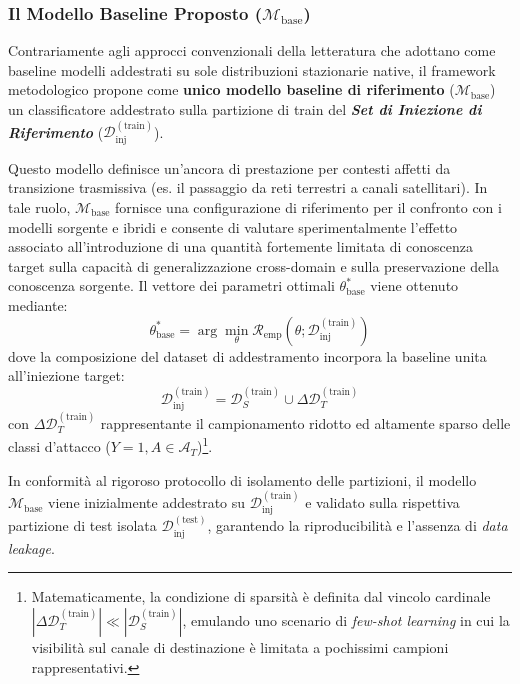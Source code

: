\subsubsection{Il Modello Baseline Proposto ($\mathcal{M}_{\text{base}}$)}
\label{subsubsec:modello_baseline}
Contrariamente agli approcci convenzionali della letteratura che adottano come baseline modelli addestrati su sole distribuzioni stazionarie native, il framework metodologico propone come \textbf{unico modello baseline di riferimento} ($\mathcal{M}_{\text{base}}$) un classificatore addestrato sulla partizione di train del \textbf{\textit{Set di Iniezione di Riferimento}} ($\mathcal{D}_{\text{inj}}^{(\text{train})}$).

Questo modello definisce un'ancora di prestazione per contesti affetti da transizione trasmissiva (es. il passaggio da reti terrestri a canali satellitari). 
In tale ruolo, $\mathcal{M}_{\text{base}}$ fornisce una configurazione di riferimento per il confronto con i modelli sorgente e ibridi e consente di valutare sperimentalmente l'effetto associato all'introduzione di una quantità fortemente limitata di conoscenza target sulla capacità di generalizzazione cross-domain e sulla preservazione della conoscenza sorgente. 
Il vettore dei parametri ottimali $\theta_{\text{base}}^*$ viene ottenuto mediante:
\begin{equation}
    \theta_{\text{base}}^* = \arg\min_\theta \mathcal{R}_{\text{emp}}\left(\theta; \mathcal{D}_{\text{inj}}^{(\text{train})}\right)
    \label{eq:mbase_optimization}
\end{equation}
dove la composizione del dataset di addestramento incorpora la baseline unita all'iniezione target:
\begin{equation}
    \mathcal{D}_{\text{inj}}^{(\text{train})} = \mathcal{D}_{S}^{(\text{train})} \cup \Delta \mathcal{D}_{T}^{(\text{train})}
    \label{eq:dinj_composition}
\end{equation}
con $\Delta \mathcal{D}_{T}^{(\text{train})}$ rappresentante il campionamento ridotto ed altamente sparso delle classi d'attacco ($Y=1, A \in \mathcal{A}_T$)\footnote{Matematicamente, la condizione di sparsità è definita dal vincolo cardinale $|\Delta \mathcal{D}_{T}^{(\text{train})}| \ll |\mathcal{D}_{S}^{(\text{train})}|$, emulando uno scenario di \textit{few-shot learning} in cui la visibilità sul canale di destinazione è limitata a pochissimi campioni rappresentativi.}.

In conformità al rigoroso protocollo di isolamento delle partizioni, il modello $\mathcal{M}_{\text{base}}$ viene inizialmente addestrato su $\mathcal{D}_{\text{inj}}^{(\text{train})}$ e validato sulla rispettiva partizione di test isolata $\mathcal{D}_{\text{inj}}^{(\text{test})}$, garantendo la riproducibilità e l'assenza di \textit{data leakage}.

